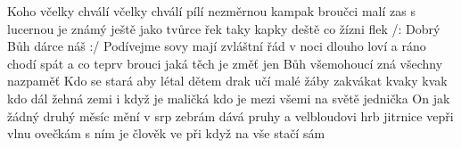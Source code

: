 \begin{TEXT}{Koho včelky chválí}
\SLOKA {} včelky chválí pílí             nezměrnou \NL
kampak broučci malí zas  s lucernou \NL
{} je známý ještě jako tvůrce řek \NL
taky kapky deště co  žízni flek 
\REFREN  /: Dobrý     Bůh   \NL
{}  dárce  náš  :/ 
\SLOKA Podívejme sovy mají zvláštní řád \NL
v noci dlouho loví a ráno chodí spát \NL
a co teprv brouci jaká těch je změť \NL
jen Bůh všemohoucí zná všechny nazpaměť 
\SLOKA Kdo se stará aby létal dětem drak \NL
učí malé žáby zakvákat kvaky kvak \NL
kdo dál žehná zemi i když je maličká \NL
kdo je mezi všemi na světě jednička 
\SLOKA On jak žádný druhý měsíc mění v srp \NL
zebrám dává pruhy a velbloudovi hrb \NL
jitrnice vepři vlnu ovečkám \NL
s ním je člověk ve při \NL
když na vše stačí sám \NL
\end{TEXT}
